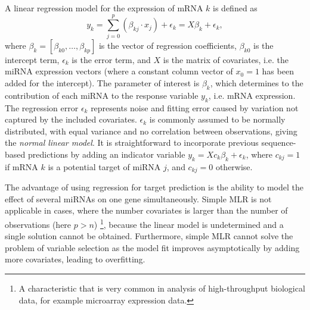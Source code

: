 A linear regression model for the expression of mRNA $k$ is defined as
\begin{equation}
  \label{eq:linear-regression}
	y_k = \sum_{j=0}^{p} (\beta_{kj} \cdot x_j) + \epsilon_k =  X \beta_k + \epsilon_k,
\end{equation}
where $\beta_k = [\beta_{k0}, \dotsc, \beta_{kp}]$ is the vector of regression coefficients,
$\beta_{k0}$ is the intercept term, $\epsilon_k$ is the error term, and $X$ is the
matrix of covariates, i.e. the miRNA expression vectors (where a constant column
vector of $x_0=1$ has been added for the intercept). The parameter of
interest is $\beta_k$, which determines to the contribution of each miRNA to the
response variable $y_k$, i.e. mRNA expression. The regression error $\epsilon_k$
represents noise and fitting error caused by variation not captured by the
included covariates. $\epsilon_k$ is commonly assumed to be normally
distributed, with equal variance and no correlation between observations,
giving the \emph{normal linear model}. It is straightforward to incorporate previous
sequence-based predictions by adding an indicator variable $y_k = X c_k \beta_k + \epsilon_k$,
where $c_{kj} = 1$ if mRNA $k$ is a potential target of miRNA $j$, and $c_{kj} = 0$ otherwise.

The advantage of using regression for target prediction is the ability to
model the effect of several miRNAs on one gene simultaneously.
Simple MLR is not applicable in cases, where the number covariates is larger
than the number of observations (here $p > n$)
\footnote{A characteristic that is very common
in analysis of high-throughput biological data, for example microarray
expression data.}, because the linear model is
undetermined and a single solution cannot be obtained.
Furthermore, simple MLR cannot solve the problem of
variable selection as the model fit improves asymptotically
by adding more covariates, leading to overfitting.

